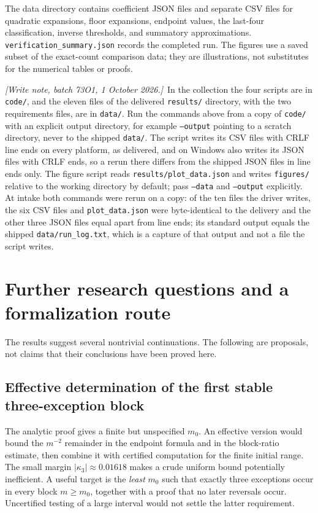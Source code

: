 \documentclass[11pt,a4paper]{article}
\numberwithin{equation}{section}
\theoremstyle{definition}
\theoremstyle{remark}
\newcommand{\writenote}[1]{\par\smallskip\noindent
 \textit{[Write note, batch 73O1, 1 October 2026.]}\ #1\par\smallskip}
\begin{document}
The data directory contains coefficient JSON files and separate CSV
files for quadratic expansions, floor expansions, endpoint values,
the last-four classification, inverse thresholds, and summatory
approximations. \texttt{verification\_summary.json} records the completed
run. The figures use a saved subset of the exact-count comparison data;
they are illustrations, not substitutes for the numerical tables or
proofs.

\writenote{In the collection the four scripts are in \texttt{code/}, and
the eleven files of the delivered \texttt{results/} directory, with the
two requirements files, are in \texttt{data/}. Run the commands above
from a copy of \texttt{code/} with an explicit output directory, for
example \texttt{--output} pointing to a scratch directory, never to the
shipped \texttt{data/}. The script writes its CSV files with CRLF line
ends on every platform, as delivered, and on Windows also writes its
JSON files with CRLF ends, so a rerun there differs from the shipped
JSON files in line ends only. The figure script reads
\texttt{results/plot\_data.json} and writes \texttt{figures/} relative
to the working directory by default; pass \texttt{--data} and
\texttt{--output} explicitly. At intake both commands were rerun on a
copy: of the ten files the driver writes, the six CSV files and
\texttt{plot\_data.json} were byte-identical to the delivery and the
other three JSON files equal apart from line ends; its standard output
equals the shipped \texttt{data/run\_log.txt}, which is a capture of
that output and not a file the script writes.}

\section{Further research questions and a formalization route}
\label{srp:sec:future}

The results suggest several nontrivial continuations. The following are
proposals, not claims that their conclusions have been proved here.

\subsection{Effective determination of the first stable three-exception block}
The analytic proof gives a finite but unspecified $m_0$. An effective
version would bound the $m^{-2}$ remainder in the endpoint formula and
in the block-ratio estimate, then combine it with certified computation
for the finite initial range. The small margin
$|\kappa_3|\approx0.01618$ makes a crude uniform bound potentially
inefficient. A useful target is the \emph{least} $m_0$ such that exactly
three exceptions occur in every block $m\ge m_0$, together with a proof
that no later reversals occur. Uncertified testing of a large interval
would not settle the latter requirement.
\end{document}
